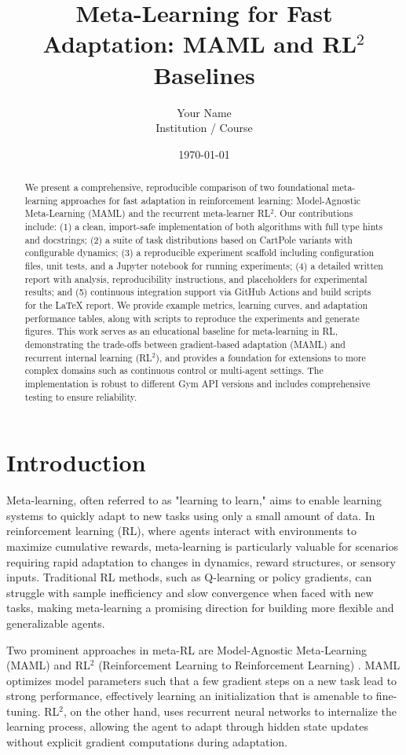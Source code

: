 \documentclass[11pt,a4paper]{article}
\title{Meta-Learning for Fast Adaptation: MAML and RL$^2$ Baselines}
\author{Your Name \\ Institution / Course}
\date{\today}
\begin{document}
\maketitle
\begin{abstract}
We present a comprehensive, reproducible comparison of two foundational meta-learning approaches for fast adaptation in reinforcement learning: Model-Agnostic Meta-Learning (MAML) and the recurrent meta-learner RL$^2$. Our contributions include: (1) a clean, import-safe implementation of both algorithms with full type hints and docstrings; (2) a suite of task distributions based on CartPole variants with configurable dynamics; (3) a reproducible experiment scaffold including configuration files, unit tests, and a Jupyter notebook for running experiments; (4) a detailed written report with analysis, reproducibility instructions, and placeholders for experimental results; and (5) continuous integration support via GitHub Actions and build scripts for the LaTeX report. We provide example metrics, learning curves, and adaptation performance tables, along with scripts to reproduce the experiments and generate figures. This work serves as an educational baseline for meta-learning in RL, demonstrating the trade-offs between gradient-based adaptation (MAML) and recurrent internal learning (RL$^2$), and provides a foundation for extensions to more complex domains such as continuous control or multi-agent settings. The implementation is robust to different Gym API versions and includes comprehensive testing to ensure reliability.
\end{abstract}

\section{Introduction}
Meta-learning, often referred to as "learning to learn," aims to enable learning systems to quickly adapt to new tasks using only a small amount of data. In reinforcement learning (RL), where agents interact with environments to maximize cumulative rewards, meta-learning is particularly valuable for scenarios requiring rapid adaptation to changes in dynamics, reward structures, or sensory inputs. Traditional RL methods, such as Q-learning or policy gradients, can struggle with sample inefficiency and slow convergence when faced with new tasks, making meta-learning a promising direction for building more flexible and generalizable agents.

Two prominent approaches in meta-RL are Model-Agnostic Meta-Learning (MAML) \cite{finn2017model} and RL$^2$ (Reinforcement Learning to Reinforcement Learning) \cite{duan2016rl2}. MAML optimizes model parameters such that a few gradient steps on a new task lead to strong performance, effectively learning an initialization that is amenable to fine-tuning. RL$^2$, on the other hand, uses recurrent neural networks to internalize the learning process, allowing the agent to adapt through hidden state updates without explicit gradient computations during adaptation.
\end{document}

